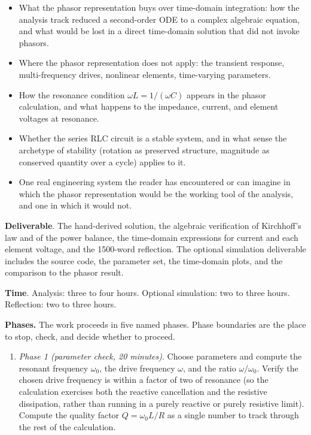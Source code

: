 \begin{project}
\begin{itemize}[leftmargin=*]
  \item What the phasor representation buys over time-domain
    integration: how the analysis track reduced a second-order
    ODE to a complex algebraic equation, and what would be lost
    in a direct time-domain solution that did not invoke
    phasors.
  \item Where the phasor representation does not apply: the
    transient response, multi-frequency drives, nonlinear
    elements, time-varying parameters.
  \item How the resonance condition $\omega L = 1/(\omega C)$
    appears in the phasor calculation, and what happens to the
    impedance, current, and element voltages at resonance.
  \item Whether the series RLC circuit is a stable system, and
    in what sense the archetype of stability (rotation as
    preserved structure, magnitude as conserved quantity over a
    cycle) applies to it.
  \item One real engineering system the reader has encountered
    or can imagine in which the phasor representation would be
    the working tool of the analysis, and one in which it would
    not.
\end{itemize}

\textbf{Deliverable}. The hand-derived solution, the algebraic
verification of Kirchhoff's law and of the power balance, the
time-domain expressions for current and each element voltage,
and the 1500-word reflection. The optional simulation deliverable
includes the source code, the parameter set, the time-domain
plots, and the comparison to the phasor result.

\textbf{Time}. Analysis: three to four hours. Optional simulation:
two to three hours. Reflection: two to three hours.

\textbf{Phases.} The work proceeds in five named phases. Phase
boundaries are the place to stop, check, and decide whether to
proceed.

\begin{enumerate}[leftmargin=*]
  \item \emph{Phase 1 (parameter check, 20 minutes)}. Choose
    parameters and compute the resonant frequency $\omega_{0}$, the
    drive frequency $\omega$, and the ratio $\omega/\omega_{0}$.
    Verify the chosen drive frequency is within a factor of two of
    resonance (so the calculation exercises both the reactive
    cancellation and the resistive dissipation, rather than running
    in a purely reactive or purely resistive limit). Compute the
    quality factor $Q = \omega_{0} L / R$ as a single number to
    track through the rest of the calculation.


\end{enumerate}
\end{project}
